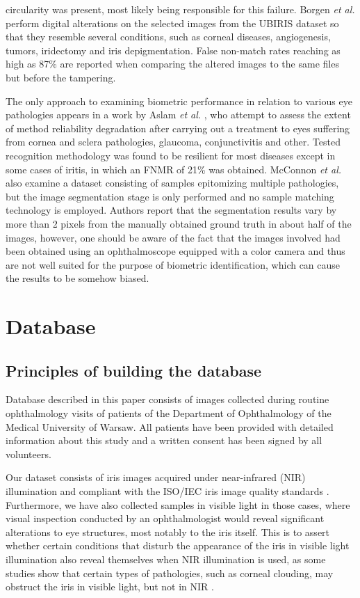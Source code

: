 \documentclass[conference]{IEEEtran}
\begin{document}
circularity was present, most likely being responsible for this failure. Borgen \emph{et al.} \cite{Borgen} perform digital alterations on the selected images from the UBIRIS dataset so that they resemble several conditions, such as corneal diseases, angiogenesis, tumors, iridectomy and iris depigmentation. False non-match rates reaching as high as 87\% are reported when comparing the altered images to the same files but before the tampering.

The only approach to examining biometric performance in relation to various eye pathologies appears in a work by Aslam \emph{et al.} \cite{Aslam}, who attempt to assess the extent of method reliability degradation after carrying out a treatment to eyes suffering from cornea and sclera pathologies, glaucoma, conjunctivitis and other. Tested recognition methodology was found to be resilient for most diseases except in some cases of iritis, in which an FNMR of 21\% was obtained. McConnon \emph{et al.} \cite{McConnon2012} also examine a dataset consisting of samples epitomizing multiple pathologies, but the image segmentation stage is only performed and no sample matching technology is employed. Authors report that the segmentation results vary by more than 2 pixels from the manually obtained ground truth in about half of the images, however, one should be aware of the fact that the images involved had been obtained using an ophthalmoscope equipped with a color camera and thus are not well suited for the purpose of biometric identification, which can cause the results to be somehow biased.

\section{Database}
\label{sec:Database}
\subsection{Principles of building the database}

Database described in this paper consists of images collected during routine ophthalmology visits of patients of the Department of Ophthalmology of the Medical University of Warsaw. All patients have been provided with detailed information about this study and a written consent has been signed by all volunteers.

Our dataset consists of iris images acquired under near-infrared (NIR) illumination and compliant with the ISO/IEC iris image quality standards \cite{ISO}.  Furthermore, we have also collected samples in visible light in those cases, where visual inspection conducted by an ophthalmologist would reveal significant alterations to eye structures, most notably to the iris itself. This is to assert whether certain conditions that disturb the appearance of the iris in visible light illumination also reveal themselves when NIR illumination is used, as some studies show that certain types of pathologies, such as corneal clouding, may obstruct the iris in visible light, but not in NIR \cite{Aslam}.
\end{document}
